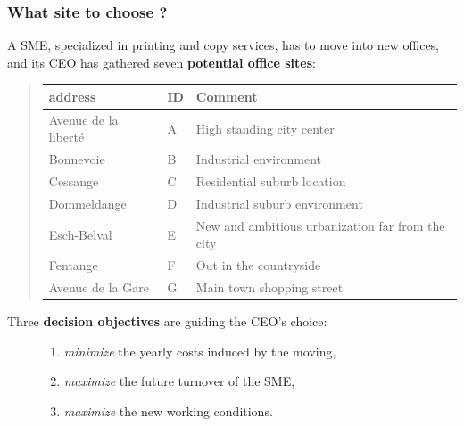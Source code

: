 \documentclass[letterpaper,10pt,english]{sphinxmanual}
\begin{document}
\subsubsection{What site to choose ?}
\label{tutorial:what-site-to-choose}
A SME, specialized in printing and copy services, has to move into new offices, and its CEO has gathered seven \textbf{potential office sites}:
\begin{quote}

\begin{tabulary}{\linewidth}{|L|L|L|}
\hline
\textsf{\relax 
address
} & \textsf{\relax 
ID
} & \textsf{\relax 
Comment
}\\
\hline
Avenue de la liberté
 & 
A
 & 
High standing city center
\\
\hline
Bonnevoie
 & 
B
 & 
Industrial environment
\\
\hline
Cessange
 & 
C
 & 
Residential suburb location
\\
\hline
Dommeldange
 & 
D
 & 
Industrial suburb environment
\\
\hline
Esch-Belval
 & 
E
 & 
New and ambitious urbanization far from the city
\\
\hline
Fentange
 & 
F
 & 
Out in the countryside
\\
\hline
Avenue de la Gare
 & 
G
 & 
Main town shopping street
\\
\hline\end{tabulary}

\end{quote}
\begin{description}
\item[{Three \textbf{decision objectives} are guiding the CEO's choice:}] \leavevmode\begin{enumerate}
\item {} 
\emph{minimize} the yearly costs induced by the moving,

\item {} 
\emph{maximize} the future turnover of the SME,

\item {} 
\emph{maximize} the new working conditions.

\end{enumerate}

\end{description}
\end{document}
